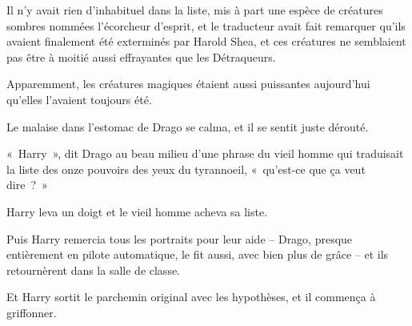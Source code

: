 Il n'y avait rien d'inhabituel dans la liste, mis à part une espèce de créatures sombres nommées l'écorcheur d'esprit, et le traducteur avait fait remarquer qu'ils avaient finalement été exterminés par Harold Shea, et ces créatures ne semblaient pas être à moitié aussi effrayantes que les Détraqueurs.

Apparemment, les créatures magiques étaient aussi puissantes aujourd'hui qu'elles l'avaient toujours été.

Le malaise dans l'estomac de Drago se calma, et il se sentit juste dérouté.

«~Harry~», dit Drago au beau milieu d'une phrase du vieil homme qui traduisait la liste des onze pouvoirs des yeux du tyrannoeil, «~qu'est-ce que ça veut dire~?~»

Harry leva un doigt et le vieil homme acheva sa liste.

Puis Harry remercia tous les portraits pour leur aide -- Drago, presque entièrement en pilote automatique, le fit aussi, avec bien plus de grâce -- et ils retournèrent dans la salle de classe.

Et Harry sortit le parchemin original avec les hypothèses, et il commença à griffonner.

\baselineskip 

\savetrivseps
\setlength{\topsep}{0pt}
\setlength{\partopsep}{0pt}

